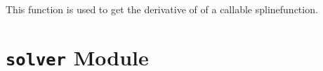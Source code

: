 \documentclass[letterpaper,10pt,english]{sphinxmanual}
\begin{document}
\begin{fulllineitems}
\begin{fulllineitems}
\begin{quote}
\begin{description}
\end{description}\end{quote}

\end{fulllineitems}


\end{fulllineitems}


\begin{fulllineitems}
\label{pytrajectory:pytrajectory.spline.fdiff}
This function is used to get the derivative of of a callable splinefunction.
\begin{quote}\begin{description}
\end{description}\end{quote}

\end{fulllineitems}



\section{\texttt{solver} Module}
\label{pytrajectory:module-pytrajectory.solver}\label{pytrajectory:solver-module}
\end{document}

